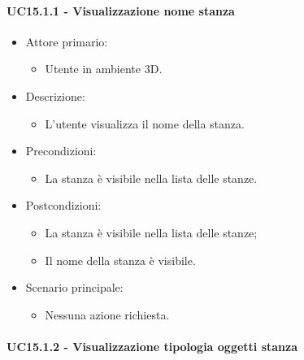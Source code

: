 \paragraph{UC15.1.1 - Visualizzazione nome stanza}

\begin{itemize}

	\item Attore primario: 
	\begin{itemize}
		\item Utente in ambiente 3D.
	\end{itemize}
	\item Descrizione:
	\begin{itemize}
		\item L'utente visualizza il nome della stanza.
	\end{itemize}
	
	\item Precondizioni:
	\begin{itemize}
		\item La stanza è visibile nella lista delle stanze.
	\end{itemize}
	
	\item Postcondizioni:
	\begin{itemize}
		\item La stanza è visibile nella lista delle stanze;
		\item Il nome della stanza è visibile.
	\end{itemize}
	
	\item Scenario principale:
	\begin{itemize}
		\item Nessuna azione richiesta.
	\end{itemize}
	
\end{itemize}


\paragraph{UC15.1.2 - Visualizzazione tipologia oggetti stanza}


